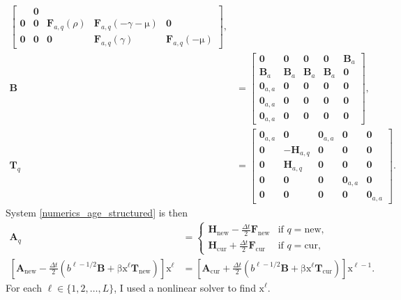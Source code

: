 \documentclass[USenglish]{article}
\renewcommand{\vec}[1]{\boldsymbol{\mathrm{#1}}}
\newcommand{\mat}[1]{\mathbf{#1}}
\begin{document}
\begin{subequations}
\begin{align}
\begin{bmatrix}
      & \mat{0}
      \\
      \mat{0} & \mat{0} & \mat{F}_{a, q}(\rho)
      & \mat{F}_{a, q}(- \gamma - \vec{\mu}) & \mat{0}
      \\
      \mat{0} & \mat{0} & \mat{0} & \mat{F}_{a, q}(\gamma)
      & \mat{F}_{a, q}(- \vec{\mu})
    \end{bmatrix},
    \\
    \mat{B} &=
    \begin{bmatrix}
      \mat{0} & \mat{0} & \mat{0} & \mat{0} & \mat{B}_a
      \\
      \mat{B}_a & \mat{B}_a & \mat{B}_a & \mat{B}_a & \mat{0}
      \\
      \mat{0}_{a,a} & \mat{0} & \mat{0} & \mat{0} & \mat{0}
      \\
      \mat{0}_{a,a} & \mat{0} & \mat{0} & \mat{0} & \mat{0}
      \\
      \mat{0}_{a,a} & \mat{0} & \mat{0} & \mat{0} & \mat{0}
    \end{bmatrix},
    \\
    \mat{T}_q &=
    \begin{bmatrix}
      \mat{0}_{a,a} & \mat{0} & \mat{0}_{a,a} & \mat{0} & \mat{0}
      \\
      \mat{0} & - \mat{H}_{a, q} & \mat{0} & \mat{0} & \mat{0}
      \\
      \mat{0} & \mat{H}_{a, q} & \mat{0} & \mat{0} & \mat{0}
      \\
      \mat{0} & \mat{0} & \mat{0} & \mat{0}_{a,a} & \mat{0}
      \\
      \mat{0} & \mat{0} & \mat{0} & \mat{0} & \mat{0}_{a,a}
    \end{bmatrix}.
  \end{align}
\end{subequations}
System \eqref{numerics_age_structured} is then
\begin{subequations}
  \label{step_age_structured}
  \begin{align}
    \mat{A}_q &=
    \begin{cases}
      \mat{H}_{\mathrm{new}} - \frac{\Delta t}{2} \mat{F}_{\mathrm{new}}
      & \text{if $q = \mathrm{new}$},
      \\
      \mat{H}_{\mathrm{cur}} + \frac{\Delta t}{2} \mat{F}_{\mathrm{cur}}
      & \text{if $q = \mathrm{cur}$},
    \end{cases}
    \\
    \left[
      \mat{A}_{\mathrm{new}}
      - \frac{\Delta t}{2} \left(
        b^{\ell - 1 / 2} \mat{B}
        + \vec{\beta} \vec{x}^{\ell} \mat{T}_{\mathrm{new}}
      \right)
    \right]
    \vec{x}^{\ell} &=
    \left[
      \mat{A}_{\mathrm{cur}}
      + \frac{\Delta t}{2} \left(
        b^{\ell - 1 / 2} \mat{B}
        + \vec{\beta} \vec{x}^{\ell} \mat{T}_{\mathrm{cur}}
      \right)
    \right]
    \vec{x}^{\ell - 1}.
  \end{align}
\end{subequations}
For each $\ell \in \{1, 2, \ldots, L\}$, I used a nonlinear
solver to find $\vec{x}^{\ell}$.
\end{document}
